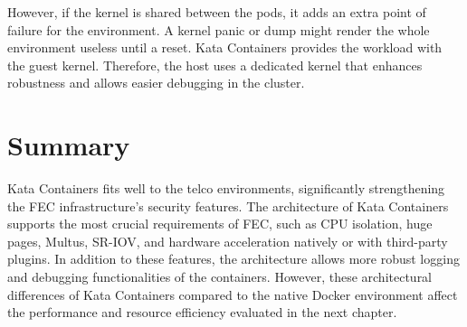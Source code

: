 However, if the kernel is shared between the pods, it adds an extra point of failure for the environment. A kernel panic or dump might render the whole environment useless until a reset. Kata Containers provides the workload with the guest kernel. Therefore, the host uses a dedicated kernel that enhances robustness and allows easier debugging in the cluster.

\section{Summary}

Kata Containers fits well to the telco environments, significantly strengthening the FEC infrastructure's security features. The architecture of Kata Containers supports the most crucial requirements of FEC, such as CPU isolation, huge pages, Multus, SR-IOV, and hardware acceleration natively or with third-party plugins. In addition to these features, the architecture allows more robust logging and debugging functionalities of the containers. However, these architectural differences of Kata Containers compared to the native Docker environment affect the performance and resource efficiency evaluated in the next chapter.